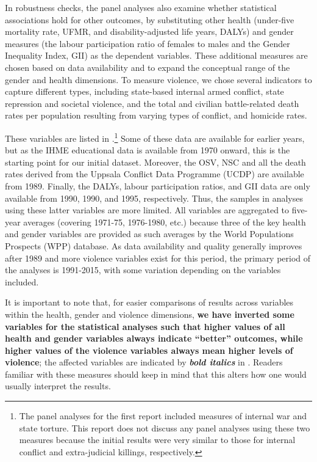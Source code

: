 \documentclass[12pt]{article}
\begin{document}
In robustness checks, the panel analyses also examine whether statistical associations hold for other outcomes, by substituting other health (under-five mortality rate, UFMR, and disability-adjusted life years, DALYs) and gender measures (the labour participation ratio of females to males and the Gender Inequality Index, GII) as the dependent variables. These additional measures are chosen based on data availability and to expand the conceptual range of the gender and health dimensions.
To measure violence, we chose several indicators to capture different types, including state-based internal armed conflict, state repression and societal violence, and the total and civilian battle-related death rates per population resulting from varying types of conflict, and homicide rates.



These variables are listed in .\footnote{
The panel analyses for the first report included measures of internal war and state torture. This report does not discuss any panel analyses using these two measures because the initial results were very similar to those for internal conflict and extra-judicial killings, respectively.} Some of these data are available for earlier years, but as the IHME educational data is available from 1970 onward, this is the starting point for our initial dataset.
Moreover, the OSV, NSC and all the death rates derived from the Uppsala Conflict Data Programme (UCDP) are available from 1989. Finally, the DALYs, labour participation ratios, and GII data are only available from 1990, 1990, and 1995, respectively.
Thus, the samples in analyses using these latter variables are more limited.
All variables are aggregated to five-year averages (covering 1971-75, 1976-1980, etc.) because three of the key health and gender variables are provided as such averages by the World Populations Prospects (WPP) database.
As data availability and quality generally improves after 1989 and more violence variables exist for this period, the primary period of the analyses is 1991-2015, with some variation depending on the variables included.

It is important to note that, for easier comparisons of results across variables within the health, gender and violence dimensions, \textbf{we have inverted some variables for the statistical analyses such that higher values of all health and gender variables always indicate \enquote{better} outcomes, while higher values of the violence variables always mean higher levels of violence}; the affected variables are indicated by \textbf{\textit{bold italics}} in . Readers familiar with these measures should keep in mind that this alters how one would usually interpret the results.
\end{document}
